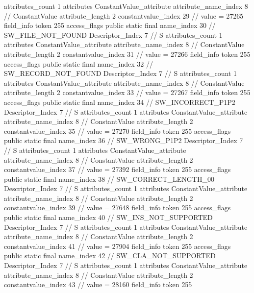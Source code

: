 {{{{{				attributes_count	1
				attributes {
				ConstantValue_attribute {
					attribute_name_index	8		// ConstantValue
					attribute_length	2
					constantvalue_index	29		// value = 27265
				}
				}
			}
			field_info {
				token	255
				access_flags	public static final
				name_index	30		// SW_FILE_NOT_FOUND
				Descriptor_Index	7		// S
				attributes_count	1
				attributes {
				ConstantValue_attribute {
					attribute_name_index	8		// ConstantValue
					attribute_length	2
					constantvalue_index	31		// value = 27266
				}
				}
			}
			field_info {
				token	255
				access_flags	public static final
				name_index	32		// SW_RECORD_NOT_FOUND
				Descriptor_Index	7		// S
				attributes_count	1
				attributes {
				ConstantValue_attribute {
					attribute_name_index	8		// ConstantValue
					attribute_length	2
					constantvalue_index	33		// value = 27267
				}
				}
			}
			field_info {
				token	255
				access_flags	public static final
				name_index	34		// SW_INCORRECT_P1P2
				Descriptor_Index	7		// S
				attributes_count	1
				attributes {
				ConstantValue_attribute {
					attribute_name_index	8		// ConstantValue
					attribute_length	2
					constantvalue_index	35		// value = 27270
				}
				}
			}
			field_info {
				token	255
				access_flags	public static final
				name_index	36		// SW_WRONG_P1P2
				Descriptor_Index	7		// S
				attributes_count	1
				attributes {
				ConstantValue_attribute {
					attribute_name_index	8		// ConstantValue
					attribute_length	2
					constantvalue_index	37		// value = 27392
				}
				}
			}
			field_info {
				token	255
				access_flags	public static final
				name_index	38		// SW_CORRECT_LENGTH_00
				Descriptor_Index	7		// S
				attributes_count	1
				attributes {
				ConstantValue_attribute {
					attribute_name_index	8		// ConstantValue
					attribute_length	2
					constantvalue_index	39		// value = 27648
				}
				}
			}
			field_info {
				token	255
				access_flags	public static final
				name_index	40		// SW_INS_NOT_SUPPORTED
				Descriptor_Index	7		// S
				attributes_count	1
				attributes {
				ConstantValue_attribute {
					attribute_name_index	8		// ConstantValue
					attribute_length	2
					constantvalue_index	41		// value = 27904
				}
				}
			}
			field_info {
				token	255
				access_flags	public static final
				name_index	42		// SW_CLA_NOT_SUPPORTED
				Descriptor_Index	7		// S
				attributes_count	1
				attributes {
				ConstantValue_attribute {
					attribute_name_index	8		// ConstantValue
					attribute_length	2
					constantvalue_index	43		// value = 28160
				}
				}
			}
			field_info {
				token	255
}}}}}
